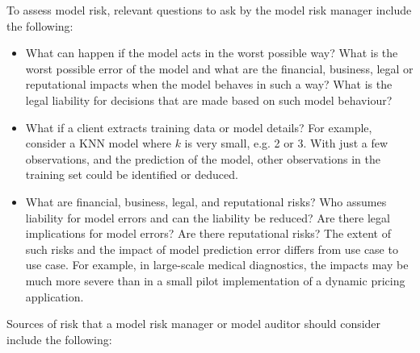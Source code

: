 To assess model risk, relevant questions to ask by the model risk manager include the following:
\begin{itemize}
    \item What can happen if the model acts in the worst possible way? What is the worst possible error of the model and what are the financial, business, legal or reputational impacts when the model behaves in such a way? What is the legal liability for decisions that are made based on such model behaviour?
    \item What if a client extracts training data or model details? For example, consider a KNN model where $k$ is very small, e.g. 2 or 3. With just a few observations, and the prediction of the model, other observations in the training set could be identified or deduced. 
    \item What are financial, business, legal, and reputational risks? Who assumes liability for model errors and can the liability be reduced? Are there legal implications for model errors? Are there reputational risks? The extent of such risks and the impact of model prediction error differs from use case to use case. For example, in large-scale medical diagnostics, the impacts may be much more severe than in a small pilot implementation of a dynamic pricing application. 
\end{itemize}

Sources of risk that a model risk manager or model auditor should consider include the following:

